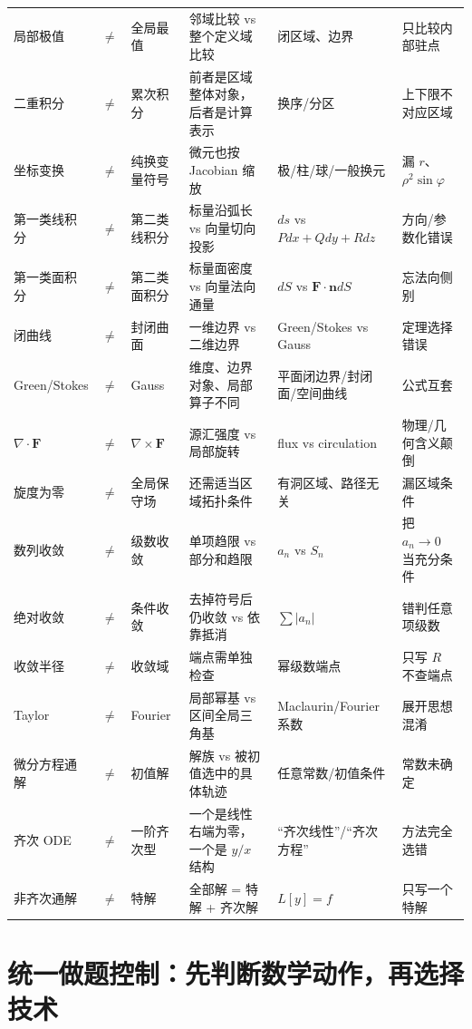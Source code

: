 \documentclass[11pt,a4paper,openany]{ctexbook}
\begin{document}
\begin{longtable}{L{2.2cm}@{}>{\centering\arraybackslash}p{0.5cm}@{}L{2.2cm}L{4.2cm}L{4.2cm}L{\dimexpr\linewidth-13.9cm\relax}}
局部极值 & $\neq$ & 全局最值 & 邻域比较 vs 整个定义域比较 & 闭区域、边界 & 只比较内部驻点\\
二重积分 & $\neq$ & 累次积分 & 前者是区域整体对象，后者是计算表示 & 换序/分区 & 上下限不对应区域\\
坐标变换 & $\neq$ & 纯换变量符号 & 微元也按 Jacobian 缩放 & 极/柱/球/一般换元 & 漏 $r$、$\rho^2\sin\varphi$\\
第一类线积分 & $\neq$ & 第二类线积分 & 标量沿弧长 vs 向量切向投影 & $ds$ vs $Pdx+Qdy+Rdz$ & 方向/参数化错误\\
第一类面积分 & $\neq$ & 第二类面积分 & 标量面密度 vs 向量法向通量 & $dS$ vs $\bm F\cdot\bm n dS$ & 忘法向侧别\\
闭曲线 & $\neq$ & 封闭曲面 & 一维边界 vs 二维边界 & Green/Stokes vs Gauss & 定理选择错误\\
Green/Stokes & $\neq$ & Gauss & 维度、边界对象、局部算子不同 & 平面闭边界/封闭面/空间曲线 & 公式互套\\
$\nabla\cdot\bm F$ & $\neq$ & $\nabla\times\bm F$ & 源汇强度 vs 局部旋转 & flux vs circulation & 物理/几何含义颠倒\\
旋度为零 & $\neq$ & 全局保守场 & 还需适当区域拓扑条件 & 有洞区域、路径无关 & 漏区域条件\\
数列收敛 & $\neq$ & 级数收敛 & 单项趋限 vs 部分和趋限 & $a_n$ vs $S_n$ & 把 $a_n\to0$ 当充分条件\\
绝对收敛 & $\neq$ & 条件收敛 & 去掉符号后仍收敛 vs 依靠抵消 & $\sum|a_n|$ & 错判任意项级数\\
收敛半径 & $\neq$ & 收敛域 & 端点需单独检查 & 幂级数端点 & 只写 $R$ 不查端点\\
Taylor & $\neq$ & Fourier & 局部幂基 vs 区间全局三角基 & Maclaurin/Fourier 系数 & 展开思想混淆\\
微分方程通解 & $\neq$ & 初值解 & 解族 vs 被初值选中的具体轨迹 & 任意常数/初值条件 & 常数未确定\\
齐次 ODE & $\neq$ & 一阶齐次型 & 一个是线性右端为零，一个是 $y/x$ 结构 & “齐次线性”/“齐次方程” & 方法完全选错\\
非齐次通解 & $\neq$ & 特解 & 全部解 = 特解 + 齐次解 & $L[y]=f$ & 只写一个特解\\
\bottomrule
\end{longtable}

\chapter{统一做题控制：先判断数学动作，再选择技术}
\end{document}
